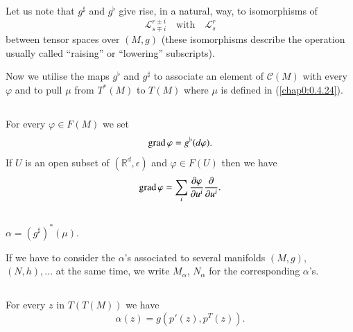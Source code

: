 \setcounter{subsection}{2}

\subsection{}\label{chap3:rem3.6.3}

\begin{remark*}
Let us note that $g^{\sharp}$ and $g^{\flat}$ give rise, in a natural,
way, to isomorphisms of 
$$
\mathscr{L}^{r\pm i}_{s\mp i}\quad\text{with}\quad \mathscr{L}^{r}_{s}
$$
between tensor spaces over $(M,g)$ (these isomorphisms describe the
operation usually called ``raising'' or ``lowering'' subscripts).
\end{remark*}

Now \pageoriginale we utilise the maps $g^{\flat}$ and $g^{\sharp}$ to
associate an 
element of $\mathscr{C}(M)$ with every $\varphi$ and to pull $\mu$
from $T^{\ast}(M)$ to $T(M)$ where $\mu$ is defined in (\ref{chap0:0.4.24}).

\subsection{}\label{chap3:3.6.4}


\begin{defi*}
For every $\varphi\in F(M)$ we set
$$
\operatorname{grad} \varphi=g^{\flat}(d\varphi).
$$
If $U$ is an open subset of $(\mathbb{R}^{d},\epsilon)$ and
$\varphi\in F(U)$ then we have
$$
\operatorname{grad} \varphi=\sum_{i}\frac{\partial\varphi}{\partial
  u^{i}}\frac{\partial}{\partial u^{i}}.
$$
\end{defi*}


\subsection{}\label{chap3:3.6.5}

\begin{defi*}
$\alpha=(g^{\sharp})^{\ast}(\mu)$.

If we have to consider the $\alpha$'s associated to several manifolds
$(M,g)$, $(N,h),\ldots$ at the same time, we write $M_{\alpha}$,
$N_{\alpha}$ for the corresponding $\alpha$'s.
\end{defi*}

\setcounter{subsection}{5}
\subsection{}\label{chap3:3.6.6}
For every $z$ in $T(T(M))$ we have
$$
\alpha(z)=g(p'(z),p^{T}(z)).
$$

